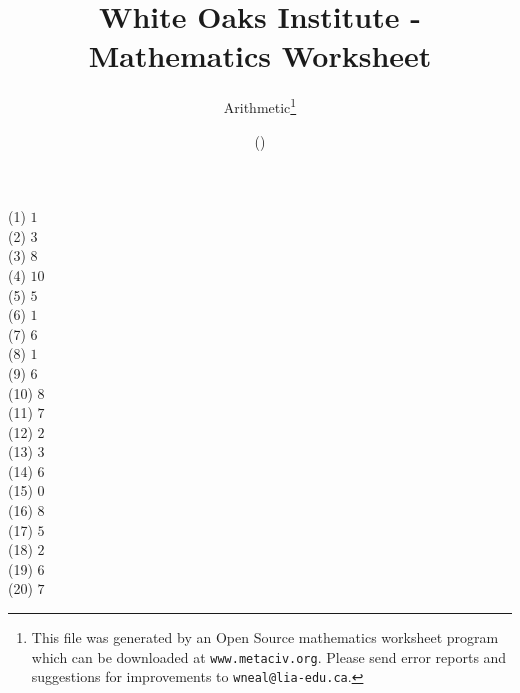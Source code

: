 \documentclass[letter]{article}
\begin{document}
\title{White Oaks Institute - Mathematics Worksheet}
\author{Arithmetic\thanks{This file was generated by an \textsf{Open Source} mathematics worksheet program which can be downloaded at \texttt{www.metaciv.org}. Please send error reports and suggestions for improvements to \texttt{wneal@lia-edu.ca}.}}
\date{\XCfileversion{} (\XCfiledate)}
\maketitle
\setlength{\parskip}{12mm plus 4mm minus 4mm}\setlength{\parindent}{0cm}\begin{multicols}{2}(1) $1$\\(2) $3$\\(3) $8$\\(4) $10$\\(5) $5$\\(6) $1$\\(7) $6$\\(8) $1$\\(9) $6$\\(10) $8$\\(11) $7$\\(12) $2$\\(13) $3$\\(14) $6$\\(15) $0$\\(16) $8$\\(17) $5$\\(18) $2$\\(19) $6$\\(20) $7$\\\end{multicols}
\end{document}
